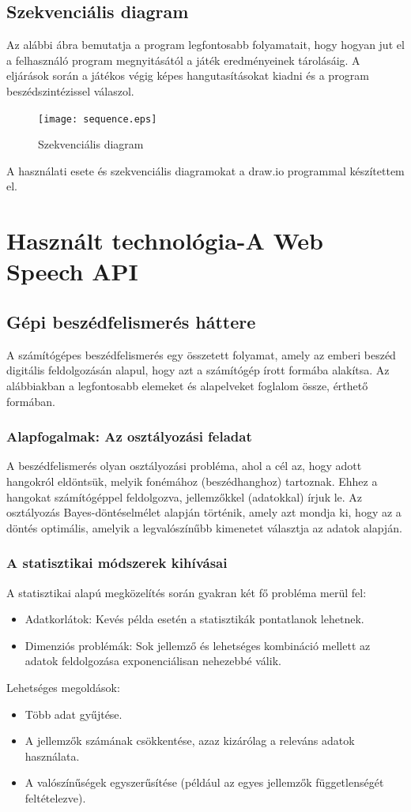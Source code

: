 \documentclass[12pt]{report}
\begin{document}
\section{Szekvenciális diagram}
\noindent
Az alábbi ábra bemutatja a program legfontosabb folyamatait, hogy hogyan jut el a felhasználó program megnyitásától a játék eredményeinek tárolásáig. A eljárások során a játékos végig képes hangutasításokat kiadni és a program beszédszintézissel válaszol.
\begin{figure}[H]
  \centerline{\texttt{[image: sequence.eps]}}
  \caption{Szekvenciális diagram}
\end{figure}
\linebreak
\noindent
A használati esete és szekvenciális diagramokat a draw.io programmal készítettem el.\cite{drawio}
\pagebreak
\chapter{Használt technológia-A Web Speech API}
\section{Gépi beszédfelismerés háttere}
A számítógépes beszédfelismerés \cite{infu} egy összetett folyamat, amely az emberi beszéd digitális feldolgozásán alapul, hogy azt a számítógép írott formába alakítsa. Az alábbiakban a legfontosabb elemeket és alapelveket foglalom össze, érthető formában.
\subsection{Alapfogalmak: Az osztályozási feladat}
A beszédfelismerés olyan osztályozási probléma, ahol a cél az, hogy adott hangokról eldöntsük, melyik fonémához (beszédhanghoz) tartoznak. Ehhez a hangokat számítógéppel feldolgozva, jellemzőkkel (adatokkal) írjuk le. Az osztályozás Bayes-döntéselmélet alapján történik, amely azt mondja ki, hogy az a döntés optimális, amelyik a legvalószínűbb kimenetet választja az adatok alapján.
\subsection{A statisztikai módszerek kihívásai}
A statisztikai alapú megközelítés során gyakran két fő probléma merül fel:
\begin{itemize}
    \item Adatkorlátok: Kevés példa esetén a statisztikák pontatlanok lehetnek.
    \item Dimenziós problémák: Sok jellemző és lehetséges kombináció mellett az adatok feldolgozása exponenciálisan nehezebbé válik.
\end{itemize}
\pagebreak
Lehetséges megoldások:
\begin{itemize}
    \item Több adat gyűjtése.
    \item A jellemzők számának csökkentése, azaz kizárólag a releváns adatok használata.
    \item A valószínűségek egyszerűsítése (például az egyes jellemzők függetlenségét feltételezve).
\end{itemize}
\end{document}
